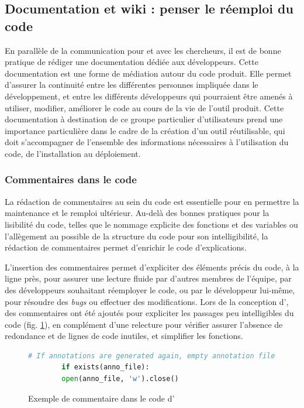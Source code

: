 \subsection{Documentation et wiki : penser le réemploi du code}
	En parallèle de la communication pour et avec les chercheurs, il est de bonne pratique de rédiger une documentation dédiée aux développeurs. Cette documentation est une forme de médiation autour du code produit. Elle permet d'assurer la continuité entre les différentes personnes impliquée dans le développement, et entre les différents développeurs qui pourraient être amenés à utiliser, modifier, améliorer le code au cours de la vie de l'outil produit. Cette documentation à destination de ce groupe particulier d'utilisateurs prend une importance particulière dans le cadre de la création d'un outil réutilisable, qui doit s'accompagner de l'ensemble des informations nécessaires à l'utilisation du code, de l'installation au déploiement.
	
    \subsubsection{Commentaires dans le code}
    La rédaction de commentaires au sein du code est essentielle pour en permettre la maintenance et le remploi ultérieur. Au-delà des bonnes pratiques pour la lisibilité du code, telles que le nommage explicite des fonctions et des variables ou l'allègement au possible de la structure du code pour son intelligibilité, la rédaction de commentaires permet d'enrichir le code d'explications. 
    
    L'insertion des commentaires permet d'expliciter des éléments précis du code, à la ligne près, pour assurer une lecture fluide par d'autres membres de l'équipe, par des développeurs souhaitant réemployer le code, ou par le développeur lui-même, pour résoudre des \textit{bugs} ou effectuer des modifications. Lors de la conception d'\exapi, des commentaires ont été ajoutés pour expliciter les passages peu intelligibles du code (fig. \ref{fig:commentaire_exapi}), en complément d'une relecture pour vérifier assurer l'absence de redondance et de lignes de code inutiles, et simplifier les fonctions. 
    
    \begin{figure}[h]
   		\begin{lstlisting}[language=Python]
   		# If annotations are generated again, empty annotation file
   		if exists(anno_file):
   		open(anno_file, 'w').close()\end{lstlisting}
   		\caption{Exemple de commentaire dans le code d'\exapi}
   		\label{fig:commentaire_exapi}
    \end{figure}
	
